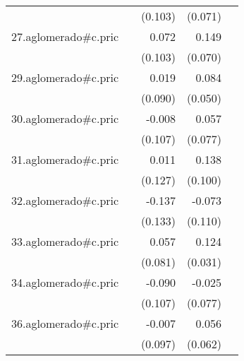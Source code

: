 {\begin{longtable}{l*{4}{D{.}{.}{-1}}}
            &                     &     (0.103)         &     (0.071)         &                     \\
\addlinespace
27.aglomerado#c.pric&                     &       0.072         &       0.149\sym{*}  &                     \\
            &                     &     (0.103)         &     (0.070)         &                     \\
\addlinespace
29.aglomerado#c.pric&                     &       0.019         &       0.084         &                     \\
            &                     &     (0.090)         &     (0.050)         &                     \\
\addlinespace
30.aglomerado#c.pric&                     &      -0.008         &       0.057         &                     \\
            &                     &     (0.107)         &     (0.077)         &                     \\
\addlinespace
31.aglomerado#c.pric&                     &       0.011         &       0.138         &                     \\
            &                     &     (0.127)         &     (0.100)         &                     \\
\addlinespace
32.aglomerado#c.pric&                     &      -0.137         &      -0.073         &                     \\
            &                     &     (0.133)         &     (0.110)         &                     \\
\addlinespace
33.aglomerado#c.pric&                     &       0.057         &       0.124\sym{***}&                     \\
            &                     &     (0.081)         &     (0.031)         &                     \\
\addlinespace
34.aglomerado#c.pric&                     &      -0.090         &      -0.025         &                     \\
            &                     &     (0.107)         &     (0.077)         &                     \\
\addlinespace
36.aglomerado#c.pric&                     &      -0.007         &       0.056         &                     \\
            &                     &     (0.097)         &     (0.062)         &                     \\

\end{longtable}}
